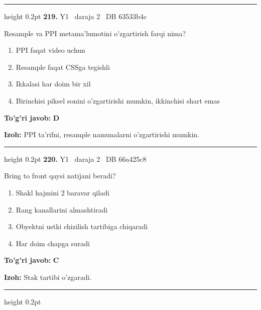 \documentclass[10pt,a4paper,oneside]{article}
\begin{document}
\vspace{2mm}\hrule height 0.2pt \vspace{4mm}
\hypertarget{q219}{\textbf{\color{ink}219.}}  {\color{muted}\scriptsize Y1 \textbullet\ daraja 2 \textbullet\ DB 63533b4c}
\par
Resample va PPI metama'lumotini o'zgartirish farqi nima?
\begin{enumerate}[label=\Alph*),leftmargin=9mm]
\item PPI faqat video uchun
\item Resample faqat CSSga tegishli
\item Ikkalasi har doim bir xil
\item Birinchisi piksel sonini o'zgartirishi mumkin, ikkinchisi shart emas
\end{enumerate}
\begin{tcolorbox}[enhanced,breakable,colback=teal!4,colframe=teal!45!black,boxrule=0.45pt,arc=1.2mm,left=2.8mm,right=2.8mm,top=2mm,bottom=2mm,before skip=2mm,after skip=2mm]
\textbf{\color{teal}To'g'ri javob:} \textbf{D}
\par\smallskip
\textbf{Izoh:} PPI ta'rifni, resample namunalarni o'zgartirishi mumkin.
\end{tcolorbox}
\vspace{2mm}\hrule height 0.2pt \vspace{4mm}
\hypertarget{q220}{\textbf{\color{ink}220.}}  {\color{muted}\scriptsize Y1 \textbullet\ daraja 2 \textbullet\ DB 66a425c8}
\par
Bring to front qaysi natijani beradi?
\begin{enumerate}[label=\Alph*),leftmargin=9mm]
\item Shakl hajmini 2 baravar qiladi
\item Rang kanallarini almashtiradi
\item Obyektni ustki chizilish tartibiga chiqaradi
\item Har doim chapga suradi
\end{enumerate}
\begin{tcolorbox}[enhanced,breakable,colback=teal!4,colframe=teal!45!black,boxrule=0.45pt,arc=1.2mm,left=2.8mm,right=2.8mm,top=2mm,bottom=2mm,before skip=2mm,after skip=2mm]
\textbf{\color{teal}To'g'ri javob:} \textbf{C}
\par\smallskip
\textbf{Izoh:} Stak tartibi o'zgaradi.
\end{tcolorbox}
\vspace{2mm}\hrule height 0.2pt \vspace{4mm}
\end{document}
